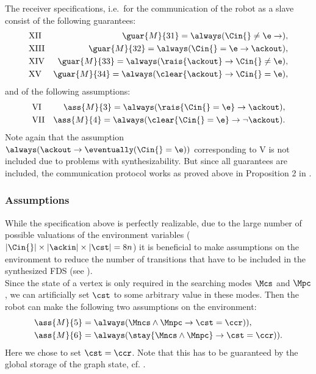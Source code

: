 The receiver specifications, i.e.\ for the communication of the robot as a slave consist of the following guarantees:
\begin{eqnarray*}
	&\mathrm{XII} &\guar{M}{31} = \always(\Cin{}\neq\e \rightarrow \next\ackout),\\
	&\mathrm{XIII} &\guar{M}{32} = \always(\Cin{}=\e \rightarrow \next\neg\ackout),\\
	&\mathrm{XIV} &\guar{M}{33} = \always(\rais{\ackout} \rightarrow \Cin{}\neq\e),\\
	&\mathrm{XV} &\guar{M}{34} = \always(\clear{\ackout} \rightarrow \Cin{}=\e),
\end{eqnarray*}
and of the following assumptions:
\begin{eqnarray*}
	&\mathrm{VI} &\ass{M}{3} = \always(\rais{\Cin{}=\e} \rightarrow \ackout),\\
	&\mathrm{VII} &\ass{M}{4} = \always(\clear{\Cin{}=\e} \rightarrow \neg\ackout).
\end{eqnarray*}
Note again that the assumption $\always(\ackout \rightarrow \eventually(\Cin{}=\e))$ corresponding to V is not included due to problems with synthesizability. But since all guarantees are included, the communication protocol works as proved above in Proposition 2 in .\\


\subsubsection{Assumptions}

While the specification above is perfectly realizable, due to the large number of possible valuations of the environment variables ($|\Cin{}| \times |\ackin| \times |\cst| = 8n$) it is beneficial to make assumptions on the environment to reduce the number of transitions that have to be included in the synthesized FDS (see ).\\

Since the state of a vertex is only required in the searching modes $\Mcs$ and $\Mpc$, we can artificially set $\cst$ to some arbitrary value in these modes. Then the robot can make the following two assumptions on the environment:
\begin{align*}
	&\ass{M}{5} = \always(\Mncs \wedge \Mnpc \rightarrow \next(\cst=\ccr)),\\
	&\ass{M}{6} = \always(\stay{\Mncs \wedge \Mnpc} \rightarrow \next(\cst=\ccr)).
\end{align*}
Here we chose to set $\cst= \ccr$. Note that this has to be guaranteed by the global storage of the graph state, cf. .\\



